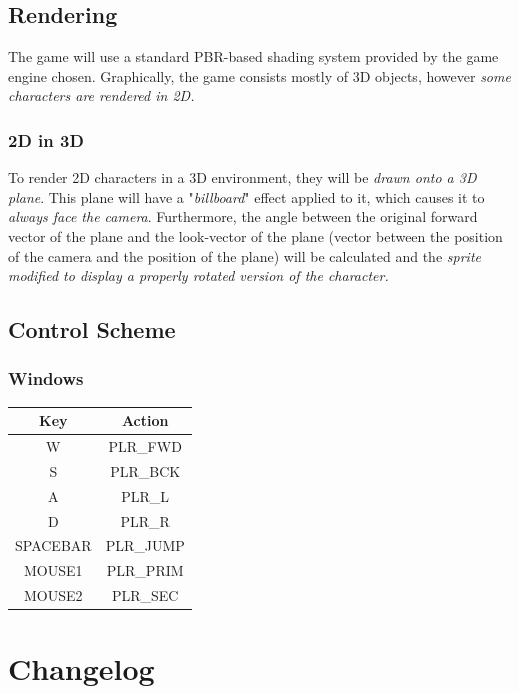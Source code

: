 \documentclass[10pt,a4paper]{article}
\begin{document}
\subsection{Rendering}
The game will use a standard PBR-based shading system provided by the game engine chosen. Graphically, the game consists mostly of 3D objects, however \emph{some characters are rendered in 2D. }
\subsubsection{2D in 3D}
To render 2D characters in a 3D environment, they will be \emph{drawn onto a 3D plane}. This plane will have a "\emph{billboard}" effect applied to it, which causes it to \emph{always face the camera}. Furthermore, the angle between the original forward vector of the plane and the look-vector of the plane (vector between the position of the camera and the position of the plane) will be calculated and the \emph{sprite modified to display a properly rotated version of the character.}

\subsection{Control Scheme}
\subsubsection{Windows}
\begin{tabular}{|c|c|}
\hline
Key&Action\\
\hline
W&PLR\_FWD\\
S&PLR\_BCK\\
A&PLR\_L\\
D&PLR\_R\\
SPACEBAR&PLR\_JUMP\\
MOUSE1&PLR\_PRIM\\
MOUSE2&PLR\_SEC\\
\hline
\end{tabular}

\section{Changelog}
\end{document}
